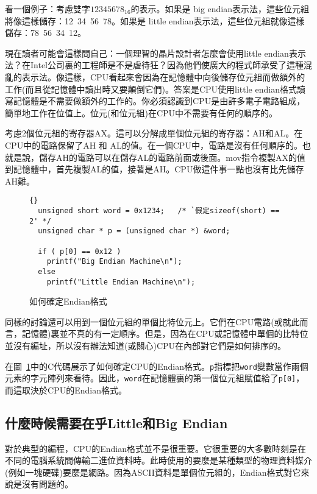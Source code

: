 看一個例子：考慮雙字$12345678_{16}$的表示。如果是
big endian表示法，這些位元組將像這樣儲存：12~34~56~78。如果是
little endian表示法，這些位元組就像這樣儲存：78~56~34~12。

現在讀者可能會這樣問自己：一個理智的晶片設計者怎麼會使用little endian表示法？在Intel公司裏的工程師是不是虐待狂？因為他們使廣大的程式師承受了這種混亂的表示法。像這樣，CPU看起來會因為在記憶體中向後儲存位元組而做額外的工作(而且從記憶體中讀出時又要顛倒它們)。答案是CPU使用little endian格式讀寫記憶體是不需要做額外的工作的。你必須認識到CPU是由許多電子電路組成，簡單地工作在位值上。位元(和位元組)在CPU中不需要有任何的順序的。

考慮2個位元組的寄存器{\code AX}。這可以分解成單個位元組的寄存器：{\code AH}和{\code AL}。在CPU中的電路保留了{\code AH} 和 {\code AL}的值。在一個CPU中，電路是沒有任何順序的。也就是說，儲存{\code AH}的電路可以在儲存{\code AL}的電路前面或後面。{\code mov}指令複製{\code AX}的值到記憶體中，首先複製{\code AL}的值，接著是{\code AH}。CPU做這件事一點也沒有比先儲存{\code AH}難。
\lstset{escapeinside=`',language=Pascal,%
}
\begin{figure}[t]
\begin{lstlisting}[stepnumber=0,frame=tblr]{}
  unsigned short word = 0x1234;   /* `假定sizeof(short) == 2' */
  unsigned char * p = (unsigned char *) &word;

  if ( p[0] == 0x12 )
    printf("Big Endian Machine\n");
  else
    printf("Little Endian Machine\n");
\end{lstlisting}
\caption{如何確定Endian格式 \label{fig:determineEndian}}
\end{figure}

同樣的討論還可以用到一個位元組的單個比特位元上。它們在CPU電路(或就此而言，記憶體)裏並不真的有一定順序。但是，因為在CPU或記憶體中單個的比特位並沒有編址，所以沒有辦法知道(或關心)CPU在內部對它們是如何排序的。

在圖~\ref{fig:determineEndian}中的C代碼展示了如何確定CPU的Endian格式。\lstinline|p|指標把\lstinline|word|變數當作兩個元素的字元陣列來看待。因此，\lstinline|word|在記憶體裏的第一個位元組賦值給了\lstinline|p[0]|，而這取決於CPU的Endian格式。

\subsection{什麼時候需要在乎Little和Big Endian}

對於典型的編程，CPU的Endian格式並不是很重要。它很重要的大多數時刻是在不同的電腦系統間傳輸二進位資料時。此時使用的要麼是某種類型的物理資料媒介(例如一塊硬碟)要麼是網路。因為ASCII資料是單個位元組的，Endian格式對它來說是沒有問題的。


